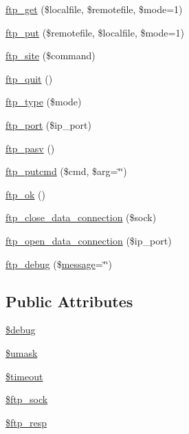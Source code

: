 \begin{DoxyCompactItemize}
\item 
\hyperlink{classftp_a1d7ba9f87f7c5d628876ffe7baf36705}{ftp\-\_\-get} (\$localfile, \$remotefile, \$mode=1)
\item 
\hyperlink{classftp_a509ed4c9d69177fe1b0ad2a02fbc8c27}{ftp\-\_\-put} (\$remotefile, \$localfile, \$mode=1)
\item 
\hyperlink{classftp_ad8d0e176790559ee27d1008dede58b6a}{ftp\-\_\-site} (\$command)
\item 
\hyperlink{classftp_a993db0725e312a4c202d6b1c84780df3}{ftp\-\_\-quit} ()
\item 
\hyperlink{classftp_ab8a20478b19800963c3a92762e78faa8}{ftp\-\_\-type} (\$mode)
\item 
\hyperlink{classftp_a94ba304efdf7e1a4a0053d94706a36c9}{ftp\-\_\-port} (\$ip\-\_\-port)
\item 
\hyperlink{classftp_a9141940878edcf85afee18e8dcdc6064}{ftp\-\_\-pasv} ()
\item 
\hyperlink{classftp_a77dcfe6900e85bbd3c22308123905eee}{ftp\-\_\-putcmd} (\$cmd, \$arg=\char`\"{}\char`\"{})
\item 
\hyperlink{classftp_a91d52ff0c56f9374cbaeae48cb54f604}{ftp\-\_\-ok} ()
\item 
\hyperlink{classftp_ae476d651d3ec9ea3b00f19371d9fcece}{ftp\-\_\-close\-\_\-data\-\_\-connection} (\$sock)
\item 
\hyperlink{classftp_a493907034238b378487fba4c25af0509}{ftp\-\_\-open\-\_\-data\-\_\-connection} (\$ip\-\_\-port)
\item 
\hyperlink{classftp_adb6a01340ad0c2f579fae61b8777aaad}{ftp\-\_\-debug} (\$\hyperlink{classmessage}{message}=\char`\"{}\char`\"{})
\end{DoxyCompactItemize}
\subsection*{Public Attributes}
\begin{DoxyCompactItemize}
\item 
\hyperlink{classftp_a757e4db04d53816db79f117809ffbad2}{\$debug}
\item 
\hyperlink{classftp_a40322387fc5aa5074daf7aaa4b7aa742}{\$umask}
\item 
\hyperlink{classftp_a219848d21bf555048933e205c270b530}{\$timeout}
\item 
\hyperlink{classftp_a3beffe299e11edfce6ffe4608c2f5dc8}{\$ftp\-\_\-sock}
\item 
\hyperlink{classftp_a2bc470fe4d815181c723061b1d2ad824}{\$ftp\-\_\-resp}
\end{DoxyCompactItemize}


